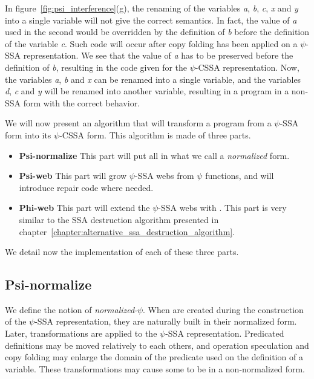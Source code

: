 In figure~\ref{fig:psi_interference}(g), the renaming of the variables
\textit{a}, \textit{b}, \textit{c}, \textit{x} and \textit{y} into a single variable
will not give the correct semantics. In fact, the value of \textit{a}
used in the second \psifun would be overridden by the
definition of \textit{b} before the definition of the variable
\textit{c}. Such code will occur after copy folding has been applied on a
$\psi$-SSA representation. We see that the value of \textit{a} has to be
preserved before the definition of \textit{b}, resulting in the code
given for the $\psi$-CSSA representation. Now, the variables \textit{a},
\textit{b} and \textit{x} can be renamed into a single variable, and the
variables \textit{d}, \textit{c} and \textit{y} will be renamed into another
variable, resulting in a program in a non-SSA form with the correct
behavior.

We will now present an algorithm that will transform a program from a
$\psi$-SSA form into its $\psi$-CSSA form. This algorithm is made of
three parts.

\begin{itemize}
\item {\bf Psi-normalize} This part will put all \psifuns
in what we call a {\em normalized} form.
\item {\bf Psi-web} This part will grow $\psi$-SSA webs from $\psi$
  functions, and will introduce repair code where needed.
\item {\bf Phi-web} This part will extend the $\psi$-SSA webs with
  \phifuns. This part is very similar to the SSA destruction
  algorithm presented in chapter~\ref{chapter:alternative_ssa_destruction_algorithm}.
\end{itemize}

We detail now the implementation of each of these three parts.

\subsection{Psi-normalize}

We define the notion of {\em normalized}-$\psi$. When \psifuns
are created during the construction of the $\psi$-SSA representation,
they are naturally built in their normalized form. Later,
transformations are applied to the $\psi$-SSA representation.
Predicated definitions may be moved relatively to each others, and
operation speculation and copy folding may enlarge the domain of the
predicate used on the definition of a variable. These transformations
may cause some \psifuns to be in a non-normalized form.

